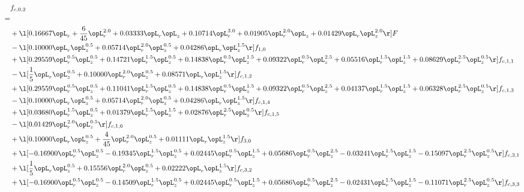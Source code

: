 \begin{alignat}{2} 
\label{eq:f_02_1} 
& f_{c,0,2} \nonumber \\ 
 = \\ 
& + \l[  0.16667 \opL_r + \frac{6}{45} \opL_r^{2.0} +  0.03333 \opL_r \opL_z +  0.10714 \opL_r^{3.0} +  0.01905 \opL_r^{2.0} \opL_z +  0.01429 \opL_r \opL_z^{2.0}  \r] F \nonumber \\ 
& - \l[  0.10000 \opL_r \opL_z^{0.5} +  0.05714 \opL_r^{2.0} \opL_z^{0.5} +  0.04286 \opL_r \opL_z^{1.5}  \r] f_{1,0} \nonumber \\ 
& + \l[  0.29559 \opL_r^{0.5} \opL_z^{0.5} +  0.14721 \opL_r^{1.5} \opL_z^{0.5} +  0.14838 \opL_r^{0.5} \opL_z^{1.5} +  0.09322 \opL_r^{0.5} \opL_z^{2.5} +  0.05516 \opL_r^{1.5} \opL_z^{1.5} +  0.08629 \opL_r^{2.5} \opL_z^{0.5}  \r] f_{c,1,1} \nonumber \\ 
& - \l[ \frac{1}{5} \opL_r \opL_z^{0.5} +  0.10000 \opL_r^{2.0} \opL_z^{0.5} +  0.08571 \opL_r \opL_z^{1.5}  \r] f_{c,1,2} \nonumber \\ 
& + \l[  0.29559 \opL_r^{0.5} \opL_z^{0.5} +  0.11041 \opL_r^{1.5} \opL_z^{0.5} +  0.14838 \opL_r^{0.5} \opL_z^{1.5} +  0.09322 \opL_r^{0.5} \opL_z^{2.5} +  0.04137 \opL_r^{1.5} \opL_z^{1.5} +  0.06328 \opL_r^{2.5} \opL_z^{0.5}  \r] f_{c,1,3} \nonumber \\ 
& - \l[  0.10000 \opL_r \opL_z^{0.5} +  0.05714 \opL_r^{2.0} \opL_z^{0.5} +  0.04286 \opL_r \opL_z^{1.5}  \r] f_{c,1,4} \nonumber \\ 
& + \l[  0.03680 \opL_r^{1.5} \opL_z^{0.5} +  0.01379 \opL_r^{1.5} \opL_z^{1.5} +  0.02876 \opL_r^{2.5} \opL_z^{0.5}  \r] f_{c,1,5} \nonumber \\ 
& - \l[  0.01429 \opL_r^{2.0} \opL_z^{0.5}  \r] f_{c,1,6} \nonumber \\ 
& + \l[  0.10000 \opL_r \opL_z^{0.5} + \frac{4}{45} \opL_r^{2.0} \opL_z^{0.5} +  0.01111 \opL_r \opL_z^{1.5}  \r] f_{3,0} \nonumber \\ 
& + \l[  -0.16900 \opL_r^{0.5} \opL_z^{0.5}   -0.19345 \opL_r^{1.5} \opL_z^{0.5} +  0.02445 \opL_r^{0.5} \opL_z^{1.5} +  0.05686 \opL_r^{0.5} \opL_z^{2.5}   -0.03241 \opL_r^{1.5} \opL_z^{1.5}   -0.15097 \opL_r^{2.5} \opL_z^{0.5}  \r] f_{c,3,1} \nonumber \\ 
& + \l[ \frac{1}{5} \opL_r \opL_z^{0.5} +  0.15556 \opL_r^{2.0} \opL_z^{0.5} +  0.02222 \opL_r \opL_z^{1.5}  \r] f_{c,3,2} \nonumber \\ 
& + \l[  -0.16900 \opL_r^{0.5} \opL_z^{0.5}   -0.14509 \opL_r^{1.5} \opL_z^{0.5} +  0.02445 \opL_r^{0.5} \opL_z^{1.5} +  0.05686 \opL_r^{0.5} \opL_z^{2.5}   -0.02431 \opL_r^{1.5} \opL_z^{1.5}   -0.11071 \opL_r^{2.5} \opL_z^{0.5}  \r] f_{c,3,3} \nonumber \\ 

\end{alignat}
